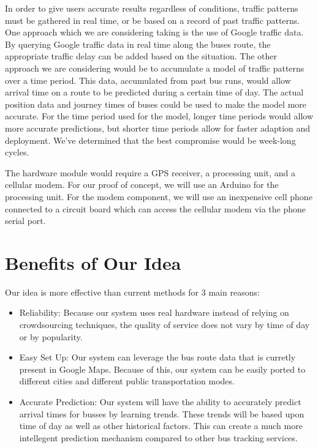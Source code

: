 \documentclass[pageno]{jpaper}
\begin{document}
In order to give users accurate results regardless of conditions, traffic patterns
must be gathered in real time, or be based on a record of past traffic patterns.
One approach which we are considering taking is the use of Google traffic data.
By querying Google traffic data in real time along the buses route, the
appropriate traffic delay can be added based on the situation. The other approach
we are considering would be to accumulate a model of traffic patterns over a 
time period. This data, accumulated from past bus runs, would allow arrival time
on a route to be predicted during a certain time of day. The actual position
data and journey times of buses could be used to make the model more accurate. 
For the time period used for the model, longer time periods would allow more 
accurate predictions, but shorter time periods allow for faster adaption and 
deployment. We've determined that the best compromise would be week-long cycles.

The hardware module would require a GPS receiver, a processing unit, and a
cellular modem. For our proof of concept, we will use an Arduino for the
processing unit. For the modem component, we will use an inexpensive cell
phone connected to a circuit board which can access the cellular modem
via the phone serial port.

\section{Benefits of Our Idea}

Our idea is more effective than current methods for 3 main reasons:
\begin{itemize}
\item Reliability: Because our system uses real hardware instead of 
        relying on crowdsourcing techniques, the quality of service
        does not vary by time of day or by popularity.
\item Easy Set Up: Our system can leverage the bus route data that 
        is curretly present in Google Maps.  Because of this, 
        our system can be easily ported to different cities 
        and different public transportation modes.
\item Accurate Prediction:  Our system will have the ability to 
        accurately predict arrival times for busses by learning 
        trends.  These trends will be based upon time of day as 
        well as other historical factors.  This can create a much 
        more intellegent prediction mechanism compared to other 
        bus tracking services.
\end{itemize}



\end{document}
